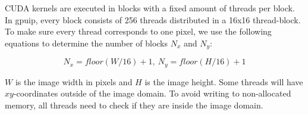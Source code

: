 CUDA kernels are executed in blocks with a fixed amount of threads per block. In gpuip, every block consists of 256 threads distributed in a 16x16 thread-block. To make sure every thread corresponds to one pixel, we use the following equations to determine the number of blocks $N_x$ and $N_y$:

\begin{equation}
N_x = floor(W/16) + 1 ,\ 
N_y = floor(H/16) + 1
\end{equation}

$W$ is the image width in pixels and $H$ is the image height. Some threads will have $xy$-coordinates outside of the image domain. To avoid writing to non-allocated memory, all threads need to check if they are inside the image domain.



